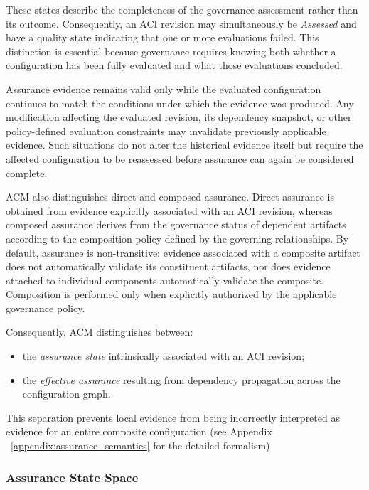 \documentclass[10pt]{article}
\begin{document}
These states describe the completeness of the governance assessment rather than its outcome. Consequently, an ACI revision may simultaneously be \textit{Assessed} and have a quality state indicating that one or more evaluations failed. This distinction is essential because governance requires knowing both whether a configuration has been fully evaluated and what those evaluations concluded.

Assurance evidence remains valid only while the evaluated configuration continues to match the conditions under which the evidence was produced. Any modification affecting the evaluated revision, its dependency snapshot, or other policy-defined evaluation constraints may invalidate previously applicable evidence. Such situations do not alter the historical evidence itself but require the affected configuration to be reassessed before assurance can again be considered complete.

ACM also distinguishes direct and composed assurance. Direct assurance is obtained from evidence explicitly associated with an ACI revision, whereas composed assurance derives from the governance status of dependent artifacts according to the composition policy defined by the governing relationships. By default, assurance is non-transitive: evidence associated with a composite artifact does not automatically validate its constituent artifacts, nor does evidence attached to individual components automatically validate the composite. Composition is performed only when explicitly authorized by the applicable governance policy.

Consequently, ACM distinguishes between:

\begin{itemize}
    \item the \emph{assurance state} intrinsically associated with an ACI
    revision;
    \item the \emph{effective assurance} resulting from dependency propagation
    across the configuration graph.
\end{itemize}

This separation prevents local evidence from being incorrectly interpreted as
evidence for an entire composite configuration (see Appendix ~\ref{appendix:assurance_semantics} for the detailed formalism)

\subsubsection{Assurance State Space}
\end{document}
